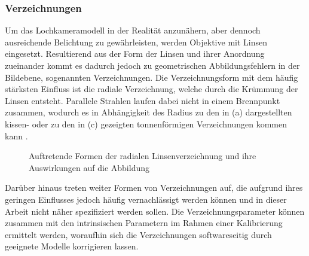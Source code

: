 \subsubsection{Verzeichnungen}
Um das Lochkameramodell in der Realität anzunähern, aber dennoch ausreichende Belichtung zu gewährleisten, werden Objektive mit Linsen eingesetzt. Resultierend aus der Form der Linsen und ihrer Anordnung zueinander kommt es dadurch jedoch zu geometrischen Abbildungsfehlern in der Bildebene, sogenannten Verzeichnungen. Die Verzeichnungsform mit dem häufig stärksten Einfluss ist die radiale Verzeichnung, welche durch die Krümmung der Linsen entsteht. Parallele Strahlen laufen dabei nicht in einem Brennpunkt zusammen, wodurch es in Abhängigkeit des Radius zu den in  (a) dargestellten kissen- oder zu den in  (c) gezeigten tonnenförmigen Verzeichnungen kommen kann \cite{Hertzberg2012}.\\

\prever{
} 

\begin{figure}[!ht]
	\begin{center}
	\hspace{4mm}
	\hspace{4mm}
	\caption{Auftretende Formen der radialen Linsenverzeichnung und ihre Auswirkungen auf die Abbildung}
	\label{fig.distortions}
	\end{center}
\end{figure}


Darüber hinaus treten weiter Formen von Verzeichnungen auf, die aufgrund ihres geringen Einflusses jedoch häufig vernachlässigt werden können und in dieser Arbeit nicht näher spezifiziert werden sollen. Die Verzeichnungsparameter können zusammen mit den intrinsischen Parametern im Rahmen einer Kalibrierung ermittelt werden, woraufhin sich die Verzeichnungen softwareseitig durch geeignete Modelle korrigieren lassen. 

